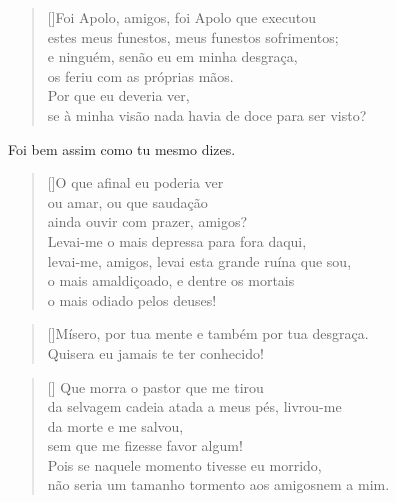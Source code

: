
\settowidth{\versewidth}{brilhante? Tenso, agito-me com medo em meu trêm}
\begin{verse}[\versewidth]Foi Apolo, amigos, foi Apolo que executou\\ 
estes meus funestos, meus funestos sofrimentos;\\
e ninguém, senão eu em minha desgraça,\\
os feriu com as próprias mãos.\\
Por que eu deveria ver,\\
se à minha visão nada havia de doce para ser visto?
\end{verse}

   Foi bem assim como tu mesmo dizes.


\settowidth{\versewidth}{levai-me, amigos, levai esta grande ruína que sou,}
\begin{verse}[\versewidth]O que afinal eu poderia ver\\
ou amar, ou que saudação\\
ainda ouvir com prazer, amigos?\\
Levai-me o mais depressa para fora daqui,\\
levai-me, amigos, levai esta grande ruína que sou,\\
o mais amaldiçoado, e dentre os mortais\\
o mais odiado pelos deuses!
\end{verse}



\settowidth{\versewidth}{brilhante? Tenso, agito-me com medo em meu trêm}
\begin{verse}[\versewidth]Mísero, por tua mente e também por tua desgraça.\\
Quisera eu jamais te ter conhecido!
\end{verse}


\settowidth{\versewidth}{da selvagem cadeia atada a meus pés, livrou-}
\begin{verse}[\versewidth]
Que morra o pastor que me tirou\\ 
da selvagem cadeia atada a meus pés, livrou-me\\
da morte e me salvou,\\
sem que me fizesse favor algum!\\
Pois se naquele momento tivesse eu morrido,\\
não seria um tamanho tormento aos amigos\qb nem a mim.
\end{verse}

